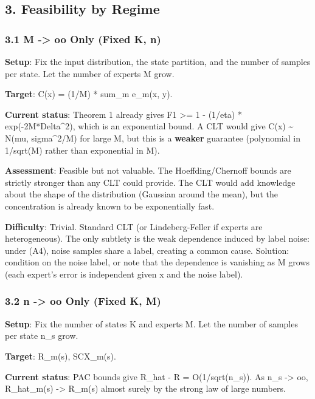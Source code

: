 \documentclass[
  12pt,
]{ctexart}
\begin{document}
\subsection{3. Feasibility by Regime}\label{feasibility-by-regime}

\subsubsection{3.1 M -\textgreater{} oo Only (Fixed K,
n)}\label{m---oo-only-fixed-k-n}

\textbf{Setup}: Fix the input distribution, the state partition, and the
number of samples per state. Let the number of experts M grow.

\textbf{Target}: C(x) = (1/M) * sum\_m e\_m(x, y).

\textbf{Current status}: Theorem 1 already gives F1 \textgreater= 1 -
(1/eta) * exp(-2M*Delta\^{}2), which is an exponential bound. A CLT
would give C(x) \textasciitilde{} N(mu, sigma\^{}2/M) for large M, but
this is a \textbf{weaker} guarantee (polynomial in 1/sqrt(M) rather than
exponential in M).

\textbf{Assessment}: Feasible but not valuable. The Hoeffding/Chernoff
bounds are strictly stronger than any CLT could provide. The CLT would
add knowledge about the shape of the distribution (Gaussian around the
mean), but the concentration is already known to be exponentially fast.

\textbf{Difficulty}: Trivial. Standard CLT (or Lindeberg-Feller if
experts are heterogeneous). The only subtlety is the weak dependence
induced by label noise: under (A4), noise samples share a label,
creating a common cause. Solution: condition on the noise label, or note
that the dependence is vanishing as M grows (each expert's error is
independent given x and the noise label).

\subsubsection{3.2 n -\textgreater{} oo Only (Fixed K,
M)}\label{n---oo-only-fixed-k-m}

\textbf{Setup}: Fix the number of states K and experts M. Let the number
of samples per state n\_s grow.

\textbf{Target}: R\_m(s), SCX\_m(s).

\textbf{Current status}: PAC bounds give \textbar R\_hat - R\textbar{} =
O(1/sqrt(n\_s)). As n\_s -\textgreater{} oo, R\_hat\_m(s)
-\textgreater{} R\_m(s) almost surely by the strong law of large
numbers.
\end{document}
